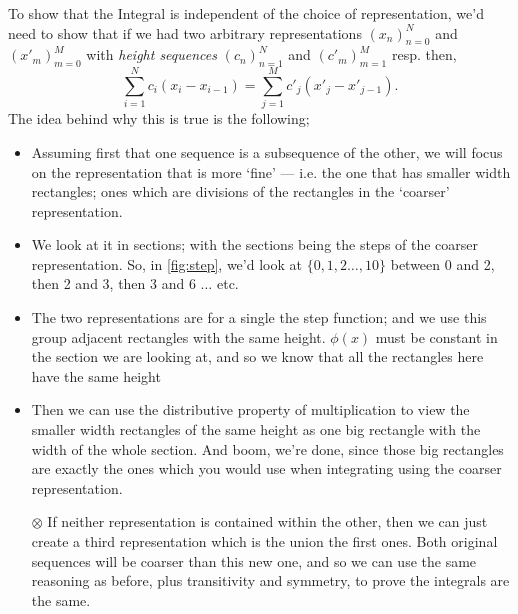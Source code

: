 To show that the Integral is independent of the choice of representation, we'd need to show that if we had two arbitrary representations $(x_n)_{n=0}^N$ and $(x'_m)_{m=0}^M$ with \emph{height sequences} $(c_n)_{n=1}^N$ and $(c'_m)_{m=1}^M$ resp. then, $$\sum_{i=1}^N c_i(x_{i} - x_{i-1}) = \sum_{j=1}^M c'_j(x'_{j} - x'_{j-1}).$$ 
The idea behind why this is true is the following; 
\begin{itemize}
\renewcommand\labelitemi{$\times$}
\item
Assuming first that one sequence is a subsequence of the other, we will focus on the representation that is more `fine' --- i.e. the one that has smaller width rectangles; ones which are divisions of the rectangles in the `coarser' representation. 
\item
We look at it in sections; with the sections being the steps of the coarser representation. So, in \ref{fig:step}, we'd look at $\{0, 1, 2 \ldots, 10\}$ between 0 and 2, then 2 and 3, then 3 and 6 $\ldots$ etc. 
\item
The two representations are for a single the step function; and we use this group adjacent rectangles with the same height. $\phi(x)$ must be constant in the section we are looking at, and so we know that all the rectangles here have the same height
\item
Then we can use the distributive property of multiplication to view the smaller width rectangles of the same height as one big rectangle with the width of the whole section. And boom, we're done, since those big rectangles are exactly the ones which you would use when integrating using the coarser representation.
\item[$\otimes$]
If neither representation is contained within the other, then we can just create a third representation which is the union the first ones. Both original sequences will be coarser than this new one, and so we can use the same reasoning as before, plus transitivity and symmetry, to prove the integrals are the same.
\end{itemize}

